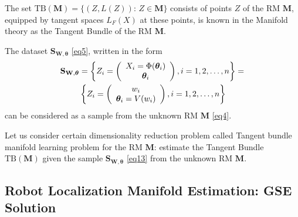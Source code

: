 \documentclass[conference]{IEEEtran} %
\def\mbtheta{{\bm\theta}}
\def\mbM{\mathbf{M}}
\def\mbS{\mathbf{S}}
\begin{document}
The set $\mathrm{TB}(\mbM) = \{(Z, L(Z)):\, Z \in \mbM\}$ consists of points $Z$ of the RM $\mbM$, equipped by tangent spaces $L_F(X)$ at these points, is known in the Manifold theory \cite{bib25} as the Tangent Bundle of the RM $\mbM$.

The dataset $\mbS_{\mathbf{W},\mbtheta}$ \eqref{eq5}, written in the form
\begin{align}
    \mbS_{\mathbf{W},\mbtheta}
    &= \left\{Z_i=
    \left(
    \begin{array}{c}
    X_i = \Phi(\mbtheta_i)\\
    \mbtheta_i
    \end{array}
    \right), i = 1,2,\ldots,n\right\}=\notag\\
    &\left\{Z_i=
    \left(
    \begin{array}{c}
    w_i\\
    \mbtheta_i = V(w_i)
    \end{array}
    \right), i = 1,2,\ldots,n\right\}
    	\label{eq13}
\end{align}
can be considered as a sample from the unknown RM $\mbM$ \eqref{eq4}.

Let us consider certain dimensionality reduction problem called Tangent bundle manifold learning problem \cite{bib26} for the RM $\mbM$: estimate the Tangent Bundle $\mathrm{TB}(\mbM)$ given the sample $\mbS_{\mathbf{W},\mbtheta}$ \eqref{eq13} from the unknown RM $\mbM$.

\subsection{Robot Localization Manifold Estimation: GSE Solution}
\label{sec4.2}
\end{document}
